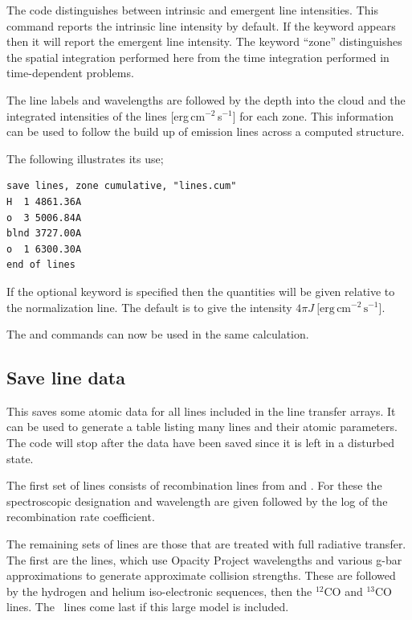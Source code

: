 The code distinguishes between intrinsic and emergent
line intensities.
This command reports the intrinsic line intensity by default.
If the keyword  appears then it will
report the emergent line intensity.
The keyword ``zone'' distinguishes the spatial integration performed
here from the time integration performed in time-dependent problems.

The line labels and wavelengths are followed by the depth into the cloud
and the integrated intensities of the lines [erg\,cm$^{-2}$\,s$^{-1}$] for each zone.
This information can be used to follow the build up of emission lines across
a computed structure.

The following illustrates its use;
\begin{verbatim}
save lines, zone cumulative, "lines.cum"
H  1 4861.36A
o  3 5006.84A
blnd 3727.00A
o  1 6300.30A
end of lines
\end{verbatim}

If the optional keyword  is specified then the quantities will
be given relative to the normalization line. The default is to give
the intensity $4\pi J\ [\mathrm{erg\, cm}^{-2}\,\mathrm{s}^{-1}$].

The  and  commands can now be used in the same calculation.

\subsection{Save line data}
\label{sec:SaveLineData}


This saves some atomic data for all lines included in the line transfer
arrays.  It can be used to generate a table listing many lines and their
atomic parameters.
The code will stop after the data have been saved since
it is left in a disturbed state.

The first set of lines consists of recombination lines from \citet{Nussbaumer1984} and \citet{Pequignot1991}.  For these
the spectroscopic designation and wavelength are given followed by the log
of the recombination rate coefficient.

The remaining sets of lines are those that are treated with full radiative
transfer.
The first are the  lines, which use Opacity Project
wavelengths and various g-bar approximations to generate approximate
collision strengths.   These are followed by the
hydrogen and helium iso-electronic sequences, then the $^{12}$CO and $^{13}$CO lines.
The \htwo\ lines come last if this large model is included.

